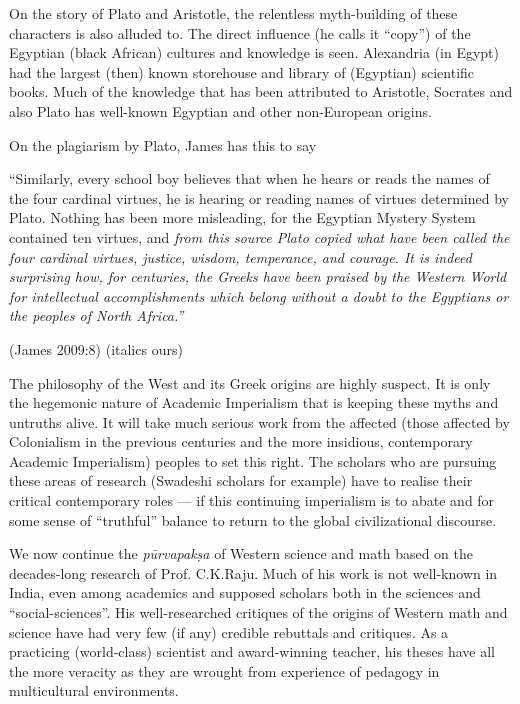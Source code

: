 On the story of Plato and Aristotle, the relentless myth-building of these characters is also alluded to. The direct influence (he calls it “copy”) of the Egyptian (black African) cultures and knowledge is seen. Alexandria (in Egypt) had the largest (then) known storehouse and library of (Egyptian) scientific books. Much of the knowledge that has been attributed to Aristotle, Socrates and also Plato has well-known Egyptian and other non-European origins.

On the plagiarism by Plato, James has this to say

\begin{myquote}
“Similarly, every school boy believes that when he hears or reads the names of the four cardinal virtues, he is hearing or reading names of virtues determined by Plato. Nothing has been more misleading, for the Egyptian Mystery System contained ten virtues, and \textit{from this source Plato copied what have been called the four cardinal virtues, justice, wisdom, temperance, and courage. It is indeed surprising how, for centuries, the Greeks have been praised by the Western World for intellectual accomplishments which belong without a doubt to the Egyptians or the peoples of North Africa.”}
\end{myquote}

\hfill (James 2009:8) (italics ours)

The philosophy of the West and its Greek origins are highly suspect. It is only the hegemonic nature of Academic Imperialism that is keeping these myths and untruths alive. It will take much serious work from the affected (those affected by Colonialism in the previous centuries and the more insidious, contemporary Academic Imperialism) peoples to set this right. The scholars who are pursuing these areas of research (Swadeshi scholars for example) have to realise their critical contemporary roles — if this continuing imperialism is to abate and for some sense of “truthful” balance to return to the global civilizational discourse.

\vskip 3pt

We now continue the \textit{pūrvapakṣa} of Western science and math based on the decades-long research of Prof. C.K.Raju. Much of his work is not well-known in India, even among academics and supposed scholars both in the sciences and “social-sciences”. His well-researched critiques of the origins of Western math and science have had very few (if any) credible rebuttals and critiques. As a practicing (world-class) scientist and award-winning teacher, his theses have all the more veracity as they are wrought from experience of pedagogy in multicultural environments.

